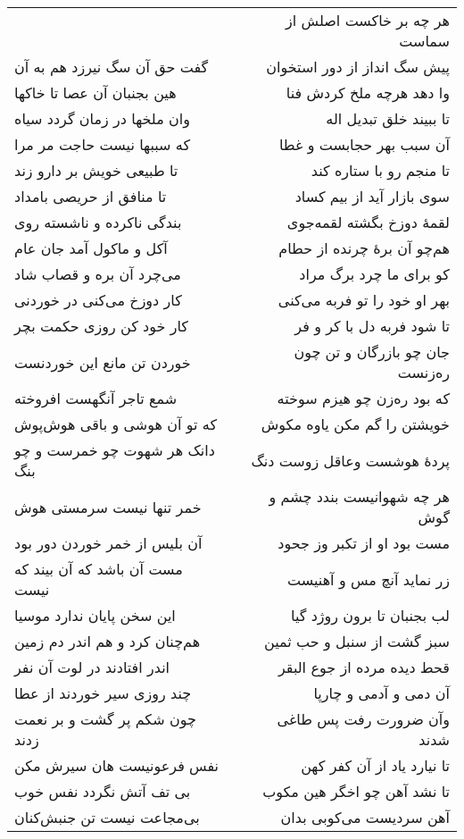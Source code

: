 \begin{center}
\begin{longtable}{l p{0.5cm} r}
&&
هر چه بر خاکست اصلش از سماست
\\
گفت حق آن سگ نیرزد هم به آن
&&
پیش سگ انداز از دور استخوان
\\
هین بجنبان آن عصا تا خاکها
&&
وا دهد هرچه ملخ کردش فنا
\\
وان ملخها در زمان گردد سیاه
&&
تا ببیند خلق تبدیل اله
\\
که سببها نیست حاجت مر مرا
&&
آن سبب بهر حجابست و غطا
\\
تا طبیعی خویش بر دارو زند
&&
تا منجم رو با ستاره کند
\\
تا منافق از حریصی بامداد
&&
سوی بازار آید از بیم کساد
\\
بندگی ناکرده و ناشسته روی
&&
لقمهٔ دوزخ بگشته لقمه‌جوی
\\
آکل و ماکول آمد جان عام
&&
هم‌چو آن برهٔ چرنده از حطام
\\
می‌چرد آن بره و قصاب شاد
&&
کو برای ما چرد برگ مراد
\\
کار دوزخ می‌کنی در خوردنی
&&
بهر او خود را تو فربه می‌کنی
\\
کار خود کن روزی حکمت بچر
&&
تا شود فربه دل با کر و فر
\\
خوردن تن مانع این خوردنست
&&
جان چو بازرگان و تن چون ره‌زنست
\\
شمع تاجر آنگهست افروخته
&&
که بود ره‌زن چو هیزم سوخته
\\
که تو آن هوشی و باقی هوش‌پوش
&&
خویشتن را گم مکن یاوه مکوش
\\
دانک هر شهوت چو خمرست و چو بنگ
&&
پردهٔ هوشست وعاقل زوست دنگ
\\
خمر تنها نیست سرمستی هوش
&&
هر چه شهوانیست بندد چشم و گوش
\\
آن بلیس از خمر خوردن دور بود
&&
مست بود او از تکبر وز جحود
\\
مست آن باشد که آن بیند که نیست
&&
زر نماید آنچ مس و آهنیست
\\
این سخن پایان ندارد موسیا
&&
لب بجنبان تا برون روژد گیا
\\
هم‌چنان کرد و هم اندر دم زمین
&&
سبز گشت از سنبل و حب ثمین
\\
اندر افتادند در لوت آن نفر
&&
قحط دیده مرده از جوع البقر
\\
چند روزی سیر خوردند از عطا
&&
آن دمی و آدمی و چارپا
\\
چون شکم پر گشت و بر نعمت زدند
&&
وآن ضرورت رفت پس طاغی شدند
\\
نفس فرعونیست هان سیرش مکن
&&
تا نیارد یاد از آن کفر کهن
\\
بی تف آتش نگردد نفس خوب
&&
تا نشد آهن چو اخگر هین مکوب
\\
بی‌مجاعت نیست تن جنبش‌کنان
&&
آهن سردیست می‌کوبی بدان

\end{longtable}
\end{center}

